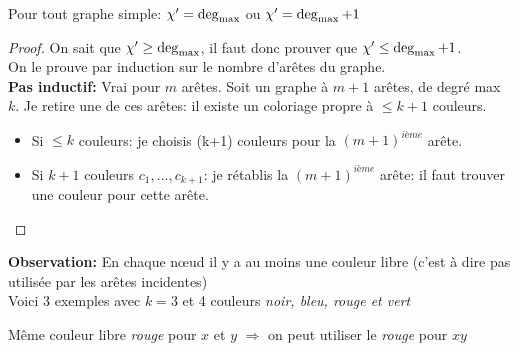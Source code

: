 \begin{mytheo} [Vizing]
Pour tout graphe simple: $\chi ' = \deg_{\mathrm{max}}$ ou  $\chi ' = \deg_{\mathrm{max}} + 1$
  \begin{proof} On sait que $\chi' \ge \deg_{\mathrm{max}}$, il faut donc prouver que $\chi ' \le \deg_{\mathrm{max}} + 1$.
  \\On le prouve par induction sur le nombre d'arêtes du graphe.
  \\ \textbf{Pas inductif:} Vrai pour $m$ arêtes. Soit un graphe à  $m+1$ arêtes, de degré max $k$. Je retire une de ces arêtes: il existe un coloriage propre à $\le k+1$ couleurs.
  \begin{itemize}
  \item Si $\le k$ couleurs: je choisis (k+1) couleurs pour la $(m+1)^{ième}$ arête.
  \item Si $k+1$ couleurs $c_{1},...,c_{k+1}$: je rétablis la $(m+1)^{ième}$ arête: il faut trouver une couleur pour cette arête.
  \end{itemize}

  \end{proof}
\end{mytheo}
\textbf{Observation:} En chaque nœud il y a au moins une couleur libre (c'est à dire pas utilisée par les arêtes incidentes)
\\
\newline Voici 3 exemples avec $k=3$ et 4 couleurs \emph{noir, bleu, rouge et vert}
\begin{myexem} \label{exemple1}
  Même couleur libre \emph{rouge} pour $x$ et $y$ $\Rightarrow$ on peut utiliser le \emph{rouge} pour $xy$
  \begin{figure}[H]
    \begin{center}
    \end{center}
  \end{figure}
\end{myexem}


